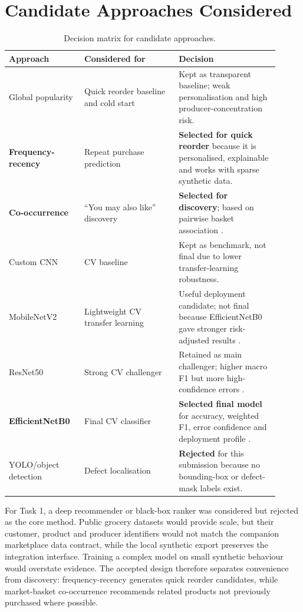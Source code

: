 \documentclass[11pt,a4paper]{article}
\begin{document}
\section{Candidate Approaches Considered}
\begin{table}[ht]
\centering
\small
\caption{Decision matrix for candidate approaches.}
\begin{tabular}{p{0.25\linewidth}p{0.32\linewidth}p{0.34\linewidth}}
\toprule
Approach & Considered for & Decision \\
\midrule
Global popularity & Quick reorder baseline and cold start & Kept as transparent baseline; weak personalisation and high producer-concentration risk. \\
\textbf{Frequency-recency} & Repeat purchase prediction & \textbf{Selected for quick reorder} because it is personalised, explainable and works with sparse synthetic data. \\
\textbf{Co-occurrence} & ``You may also like'' discovery & \textbf{Selected for discovery}; based on pairwise basket association \citep{agrawal1993association}. \\
Custom CNN & CV baseline & Kept as benchmark, not final due to lower transfer-learning robustness. \\
MobileNetV2 & Lightweight CV transfer learning & Useful deployment candidate; not final because EfficientNetB0 gave stronger risk-adjusted results \citep{sandler2018mobilenetv2}. \\
ResNet50 & Strong CV challenger & Retained as main challenger; higher macro F1 but more high-confidence errors \citep{he2016resnet}. \\
\textbf{EfficientNetB0} & Final CV classifier & \textbf{Selected final model} for accuracy, weighted F1, error confidence and deployment profile \citep{tan2019efficientnet}. \\
YOLO/object detection & Defect localisation & \textbf{Rejected} for this submission because no bounding-box or defect-mask labels exist. \\
\bottomrule
\end{tabular}
\end{table}

For Task 1, a deep recommender or black-box ranker was considered but rejected as the core method. Public grocery datasets would provide scale, but their customer, product and producer identifiers would not match the companion marketplace data contract, while the local synthetic export preserves the integration interface. Training a complex model on small synthetic behaviour would overstate evidence. The accepted design therefore separates convenience from discovery: frequency-recency generates quick reorder candidates, while market-basket co-occurrence recommends related products not previously purchased where possible.
\end{document}

